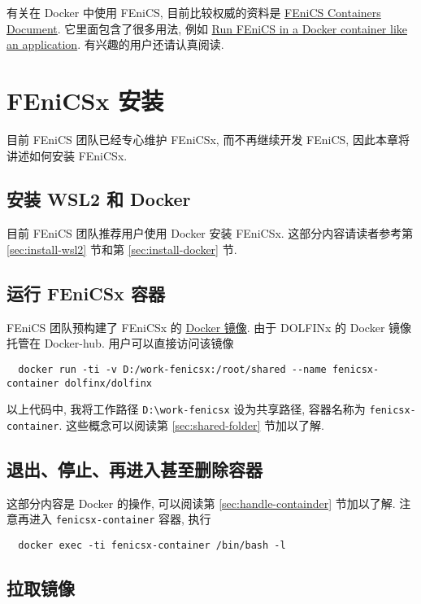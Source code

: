 \documentclass[fontset=founder]{ctexrep}
\begin{document}
有关在 Docker 中使用 FEniCS,
目前比较权威的资料是 \href{https://fenics.readthedocs.io/projects/containers/en/latest/index.html}{FEniCS Containers Document}.
它里面包含了很多用法,
例如 \href{https://fenics.readthedocs.io/projects/containers/en/latest/work_flows.html#run-fenics-in-a-docker-container-like-an-application}{Run FEniCS in a Docker container like an application}.
有兴趣的用户还请认真阅读.

\chapter{FEniCSx 安装}

目前 FEniCS 团队已经专心维护 FEniCSx,
而不再继续开发 FEniCS,
因此本章将讲述如何安装 FEniCSx.

\section{安装 WSL2 和 Docker}

目前 FEniCS 团队推荐用户使用 Docker 安装 FEniCSx.
这部分内容请读者参考第 \ref{sec:install-wsl2} 节和第 \ref{sec:install-docker} 节.

\section{运行 FEniCSx 容器}

FEniCS 团队预构建了 FEniCSx 的 \href{https://hub.docker.com/r/dolfinx/dolfinx}{Docker 镜像}.
由于 DOLFINx 的 Docker 镜像托管在 Docker-hub.
用户可以直接访问该镜像
\begin{lstlisting}
  docker run -ti -v D:/work-fenicsx:/root/shared --name fenicsx-container dolfinx/dolfinx
\end{lstlisting}
以上代码中,
我将工作路径 \texttt{D:\textbackslash work-fenicsx} 设为共享路径,
容器名称为 \texttt{fenicsx-container}.
这些概念可以阅读第 \ref{sec:shared-folder} 节加以了解.

\section{退出、停止、再进入甚至删除容器}

这部分内容是 Docker 的操作,
可以阅读第 \ref{sec:handle-containder} 节加以了解.
注意再进入 \texttt{fenicsx-container} 容器,
执行
\begin{lstlisting}
  docker exec -ti fenicsx-container /bin/bash -l
\end{lstlisting}

\section{拉取镜像}
\end{document}
